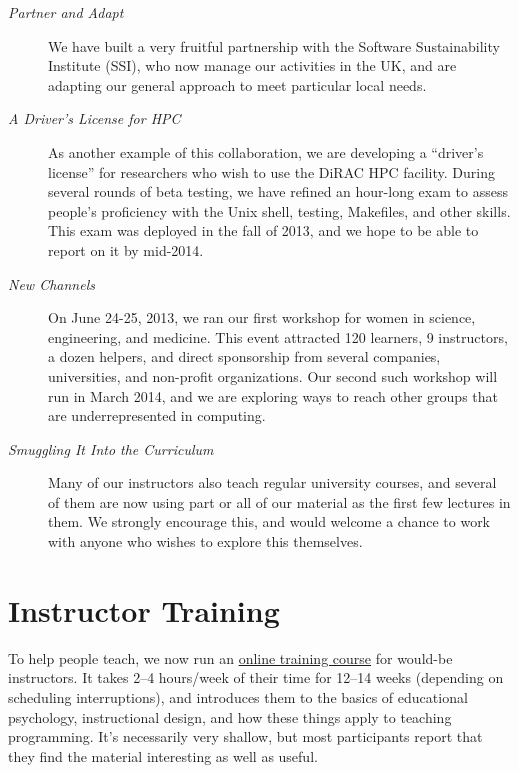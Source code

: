 \documentclass[10pt,a4paper,twocolumn]{article}
\begin{document}
\begin{description}

\item[\emph{Partner and Adapt}] We have built a very fruitful
  partnership with the Software Sustainability Institute (SSI), who
  now manage our activities in the UK, and are adapting our general
  approach to meet particular local needs.

\item[\emph{A Driver's License for HPC}] As another example of this
  collaboration, we are developing a ``driver's license'' for
  researchers who wish to use the DiRAC HPC facility. During several
  rounds of beta testing, we have refined an hour-long exam to assess
  people's proficiency with the Unix shell, testing, Makefiles, and
  other skills. This exam was deployed in the fall of 2013, and we
  hope to be able to report on it by mid-2014.

\item[\emph{New Channels}] On June 24-25, 2013, we ran our first
  workshop for women in science, engineering, and medicine. This event
  attracted 120 learners, 9 instructors, a dozen helpers, and direct
  sponsorship from several companies, universities, and non-profit
  organizations. Our second such workshop will run in March 2014, and
  we are exploring ways to reach other groups that are
  underrepresented in computing.

\item[\emph{Smuggling It Into the Curriculum}] Many of our instructors
  also teach regular university courses, and several of them are now
  using part or all of our material as the first few lectures in
  them. We strongly encourage this, and would welcome a chance to work
  with anyone who wishes to explore this themselves.

\end{description}

\section*{Instructor Training}

To help people teach, we now run an
\href{http://teaching.software-carpentry.org}{online training course}
for would-be instructors. It takes 2--4 hours/week of their time for
12--14 weeks (depending on scheduling interruptions), and introduces
them to the basics of educational psychology, instructional design,
and how these things apply to teaching programming. It's necessarily
very shallow, but most participants report that they find the material
interesting as well as useful.
\end{document}
